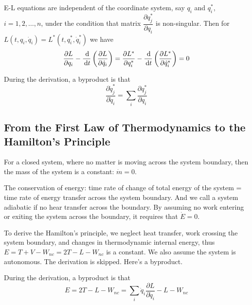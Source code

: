 \documentclass{article}
\begin{document}
\begin{proposition}
    E-L equations are independent of the coordinate system, say \(q_i\) and \(q_i^*\), \(i=1,2,\dots, n\), under the condition that matrix \(\dfrac{\partial q_j^*}{\partial q_i}\) is non-singular. Then for \(L(t,q_i,\dot q_i)=L^*(t,q_i^*, \dot q_i^*)\) we have\
    \[\frac{\partial L}{\partial q_i}-\frac{\,\mathrm{d} }{\,\mathrm{d} t}\left( \frac{\partial L }{\partial \dot q_i} \right)=\frac{\partial L^*}{\partial q_i^*}-\frac{\,\mathrm{d} }{\,\mathrm{d} t}\left( \frac{\partial L^* }{\partial \dot q_i^*} \right)=0\]
\end{proposition}

\begin{corollary}
    During the derivation, a byproduct is that
    \[\frac{\partial \dot q_j^*}{\partial \dot q_i}=\sum_i\frac{\partial q_j^*}{\partial q_i}\]
\end{corollary}

\subsection{From the First Law of Thermodynamics to the Hamilton's Principle}

\begin{theorem}
    For a closed system, where no matter is moving across the system boundary, then the mass of the system is a constant: \(\dot m=0\).
\end{theorem}

\begin{theorem}
    The conservation of energy: time rate of change of total energy of the system = time rate of energy transfer across the system boundary. And we call a system adiabatic if no hear transfer across the boundary. By assuming no work entering or exiting the system across the boundary, it requires that \(\dot E=0\).
\end{theorem}

To derive the Hamilton's principle, we neglect heat transfer, work crossing the system boundary, and changes in thermodynamic internal energy, thus \(E=T+V-W_{nc}=2T-L-W_{nc}\) is a constant. We also assume the system is autonomous.  The derivation is skipped. Here's a byproduct.

\begin{corollary}
    During the derivation, a byproduct is that
    \[E=2T-L-W_{nc}=\sum_i \dot q_i \frac{\partial L}{\partial \dot q_i}-L-W_{nc}\]
\end{corollary}
\end{document}
